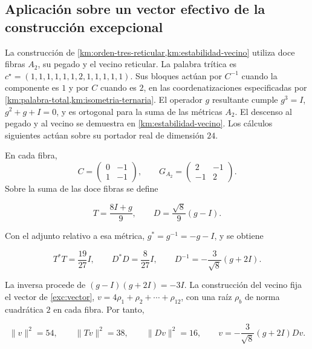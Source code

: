 \subsection{Aplicación sobre un vector efectivo de la construcción excepcional}

La construcción de
\cref{km:orden-tres-reticular,km:estabilidad-vecino}
utiliza doce fibras \(A_2\), su pegado y el vecino reticular.
La palabra trítica es
\(c^\star=(1,1,1,1,1,1,2,1,1,1,1,1)\).
Sus bloques actúan por \(C^{-1}\) cuando la componente es \(1\)
y por \(C\) cuando es \(2\), en las coordenatizaciones especificadas por
\cref{km:palabra-total,km:isometria-ternaria}.
El operador \(g\) resultante cumple
\(g^3=I\), \(g^2+g+I=0\), y es ortogonal para la suma de las
métricas \(A_2\).
El descenso al pegado y al vecino se demuestra en
\cref{km:estabilidad-vecino}.
Los cálculos siguientes actúan sobre su portador real de
dimensión \(24\).

En cada fibra,
\[
 C=\begin{pmatrix}0&-1\\1&-1\end{pmatrix},
 \qquad
 G_{A_2}=\begin{pmatrix}2&-1\\-1&2\end{pmatrix}.
\]
Sobre la suma de las doce fibras se define



\[
T=\frac{8I+g}{9},\qquad D=\frac{\sqrt8}{9}(g-I).
\]



Con el adjunto relativo a esa métrica,
\(g^*=g^{-1}=-g-I\), y se obtiene



\begin{equation}
T^*T=\frac{19}{27}I,
\qquad D^*D=\frac8{27}I,
\qquad D^{-1}=-\frac3{\sqrt8}(g+2I).
\label{nuc11:eq:18}
\end{equation}



La inversa procede de \((g-I)(g+2I)=-3I\).
La construcción del vecino fija el vector de
\eqref{exc:vector},
\(v=4\rho_1+\rho_2+\cdots+\rho_{12}\), con una raíz
\(\rho_b\) de norma cuadrática \(2\) en cada fibra.
Por tanto,



\begin{equation}
\|v\|^2=54,\qquad \|Tv\|^2=38,\qquad \|Dv\|^2=16,
\qquad v=-\frac3{\sqrt8}(g+2I)Dv.
\label{nuc11:eq:19}
\end{equation}



